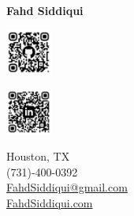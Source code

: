 \documentclass[letter,10pt]{article}
\begin{document}
	
		\begin{minipage}[c]{0.6\textwidth}
			\raggedright {\fontsize{40}{50}\selectfont \textbf{Fahd Siddiqui}} \hfill \\ %
		\end{minipage}%
		\begin{minipage}[c]{0.09\textwidth}
			\href{https://www.github.com/fahd-siddiqui}{\includegraphics[width=1.5cm]{gh-qr-code.png}}
		\end{minipage}%
		\begin{minipage}[c]{0.09\textwidth}
			\href{https://www.linkedin.com/in/SiddiquiFahd}{\includegraphics[width=1.5cm]{li-qr-code.png}}
		\end{minipage}%
		\begin{minipage}[c]{0.22\textwidth}
			\hfill \raggedleft \normalsize Houston, TX \\
			\raggedleft \normalsize (731)-400-0392 \\
			\raggedleft \normalsize \href{mailto:FahdSiddiqui@gmail.com}{FahdSiddiqui@gmail.com} \\
			\raggedleft \normalsize \href{FahdSiddiqui.com}{FahdSiddiqui.com} 
		\end{minipage}%
		
\end{document}
